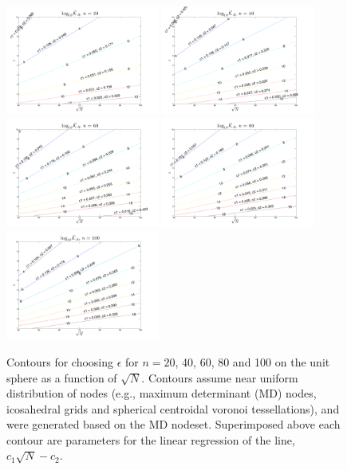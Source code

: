 \documentclass[11pt]{report}
\begin{document}
{\begin{figure}[htbp]
\centering
\includegraphics[width=0.45\textwidth]{../figures/chapter2/epsilon_contours/labeled_contour_n20.pdf}
\includegraphics[width=0.45\textwidth]{../figures/chapter2/epsilon_contours/labeled_contour_n40.pdf}
\includegraphics[width=0.45\textwidth]{../figures/chapter2/epsilon_contours/labeled_contour_n60.pdf}
\includegraphics[width=0.45\textwidth]{../figures/chapter2/epsilon_contours/labeled_contour_n80.pdf}
\includegraphics[width=0.45\textwidth]{../figures/chapter2/epsilon_contours/labeled_contour_n100.pdf}
\caption{Contours for choosing $\epsilon$ for $n=20$, 40, 60, 80 and 100 on the unit sphere as a function of $\sqrt{N}$. Contours assume near uniform distribution of nodes (e.g., maximum determinant (MD) nodes, icosahedral grids and spherical centroidal voronoi tessellations), and were generated based on the MD nodeset. Superimposed above each contour are parameters for the linear regression of the line, $c_{1} \sqrt{N} - c_{2}$. }
\label{fig:epsilon_contours}
\end{figure}

}
\end{document}

